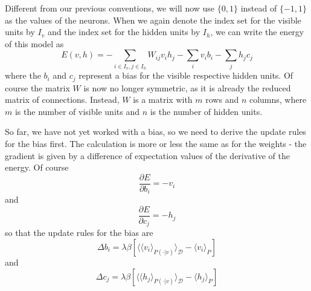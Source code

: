 \documentclass[a4paper, draft]{article}
\theoremstyle{own}
\theoremstyle{remark}
\begin{document}
Different from our previous conventions, we will now use $\{ 0,1 \}$ instead of $\{ -1, 1\}$ as the values of the neurons. When we again denote the index set for the visible units by $I_v$ and the index set for the hidden units by $I_h$, we can write the energy of this model as
$$
E(v,h) = - \sum_{i \in I_v, j \in I_h} W_{ij} v_i h_j - \sum_i v_i b_i - \sum_j h_j c_j
$$
where the $b_i$ and $c_j$ represent a bias for the visible respective hidden units.
Of course the matrix $W$ is now no longer symmetric, as it is already the reduced matrix of connections. Instead, $W$ is a matrix with $m$ rows and $n$ columns, where $m$ is the number of visible units and $n$ is the number of hidden units.

So far, we have not yet worked with a bias, so we need to derive the update rules for the bias first. The calculation is more or less the same as for the weights - the gradient is given by a difference of expectation values of the derivative of the energy. Of course
$$
\frac{\partial E}{\partial b_i} = - v_i
$$
and
$$
\frac{\partial E}{\partial c_j} = - h_j
$$
so that the update rules for the bias are
$$
\Delta b_i = \lambda \beta \left[
\langle \langle  v_i \rangle_{P(\cdot | v)} \rangle_{\mathcal D} 
- 
\langle v_i \rangle_P  
\right] 
$$
and
$$
\Delta c_j = \lambda \beta \left[
\langle \langle  h_j \rangle_{P(\cdot | v)} \rangle_{\mathcal D} 
- 
\langle h_j \rangle_P  
\right] 
$$
\end{document}
